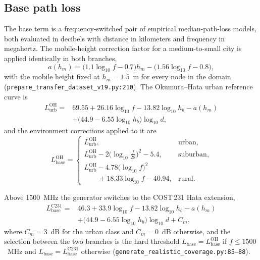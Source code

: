 \subsection{Base path loss}

The base term is a frequency-switched pair of empirical median-path-loss
models, both evaluated in decibels with distance in kilometers and
frequency in megahertz. The mobile-height correction factor for a
medium-to-small city is applied identically in both branches,
\begin{equation}
a(h_{m}) = \bigl(1.1\log_{10} f - 0.7\bigr)h_{m}
         - \bigl(1.56\log_{10} f - 0.8\bigr) ,
\label{eq:app-ahm}
\end{equation}
with the mobile height fixed at $h_{m}=1.5$~m for every node in the domain
(\texttt{prepare\_\allowbreak{}transfer\_\allowbreak{}dataset\_\allowbreak{}v19.py:\allowbreak{}210}). The Okumura--Hata urban
reference curve is
\begin{equation}
\begin{split}
L_{\mathrm{urb}}^{\mathrm{OH}} = {}& 69.55 + 26.16\log_{10} f
   - 13.82\log_{10} h_{b} - a(h_{m}) \\
 & + \bigl(44.9 - 6.55\log_{10} h_{b}\bigr)\log_{10} d ,
\end{split}
\label{eq:app-hata-urban}
\end{equation}
and the environment corrections applied to it are
\begin{equation}
L_{\mathrm{base}}^{\mathrm{OH}} =
\begin{cases}
L_{\mathrm{urb}}^{\mathrm{OH}}, & \text{urban},\\[2pt]
L_{\mathrm{urb}}^{\mathrm{OH}} - 2\bigl(\log_{10}\tfrac{f}{28}\bigr)^{2} - 5.4,
  & \text{suburban},\\[2pt]
L_{\mathrm{urb}}^{\mathrm{OH}} - 4.78\bigl(\log_{10} f\bigr)^{2} & \\
  \qquad {} + 18.33\log_{10} f - 40.94, & \text{rural}.
\end{cases}
\label{eq:app-hata-env}
\end{equation}

Above 1500~MHz the generator switches to the COST\,231 Hata extension,
\begin{equation}
\begin{split}
L_{\mathrm{base}}^{\mathrm{C231}} = {}& 46.3 + 33.9\log_{10} f
   - 13.82\log_{10} h_{b} - a(h_{m}) \\
 & + \bigl(44.9 - 6.55\log_{10} h_{b}\bigr)\log_{10} d + C_{m} ,
\end{split}
\label{eq:app-cost231}
\end{equation}
where $C_{m}=3$~dB for the urban class and $C_{m}=0$~dB otherwise, and the
selection between the two branches is the hard threshold
$L_{\mathrm{base}} = L_{\mathrm{base}}^{\mathrm{OH}}$ if $f\le 1500$~MHz and
$L_{\mathrm{base}} = L_{\mathrm{base}}^{\mathrm{C231}}$ otherwise
(\texttt{generate\_\allowbreak{}realistic\_\allowbreak{}coverage\allowbreak{}.py:\allowbreak{}85--88}).

